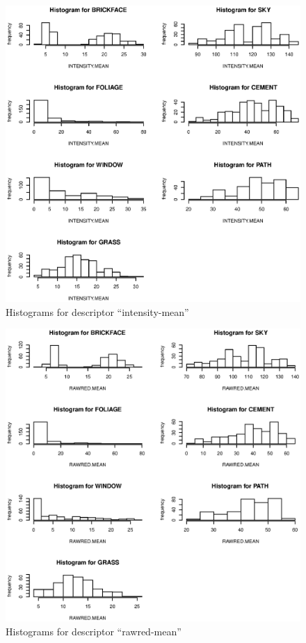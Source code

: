 \documentclass{article}
\begin{document}
\begin{figure}[htp]
\centering
\includegraphics[width=12cm]{a10.eps}
\caption{Histograms for descriptor ``intensity-mean''}
\end{figure}

\begin{figure}[htp]
\centering
\includegraphics[width=12cm]{a11.eps}
\caption{Histograms for descriptor ``rawred-mean''}
\end{figure}
\end{document}
